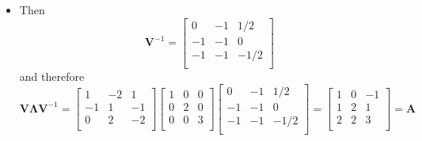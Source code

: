 \documentclass[12pt,a4paper]{article}
\begin{document}
\begin{itemize}
\begin{itemize}
  \item Then
    \begin{equation}\nonumber%
      \bm{V}^{-1}
      =
      \begin{bmatrix}
        0 & -1 & 1/2 \\
        -1 & -1 & 0 \\
        -1 & -1 & -1/2 \\
      \end{bmatrix}
    \end{equation}
    and therefore
    \begin{equation}\nonumber%
      \bm{V}\bm{\Lambda}\bm{V}^{-1}
      = 
      \begin{bmatrix}
        1 & -2 & 1 \\
        -1 & 1 & -1\\
        0 & 2 & -2 \\
      \end{bmatrix}
      \begin{bmatrix}
        1 & 0 & 0 \\
        0 & 2 & 0 \\
        0 & 0 & 3 \\
      \end{bmatrix}
      \begin{bmatrix}
        0 & -1 & 1/2 \\
        -1 & -1 & 0 \\
        -1 & -1 & -1/2 \\
      \end{bmatrix}
      =
      \begin{bmatrix}
        1 & 0 & -1 \\
        1 & 2 & 1 \\
        2 & 2 & 3 \\
      \end{bmatrix}
      = \bm{A}
    \end{equation}

  \end{itemize}


\end{itemize}
\end{document}
